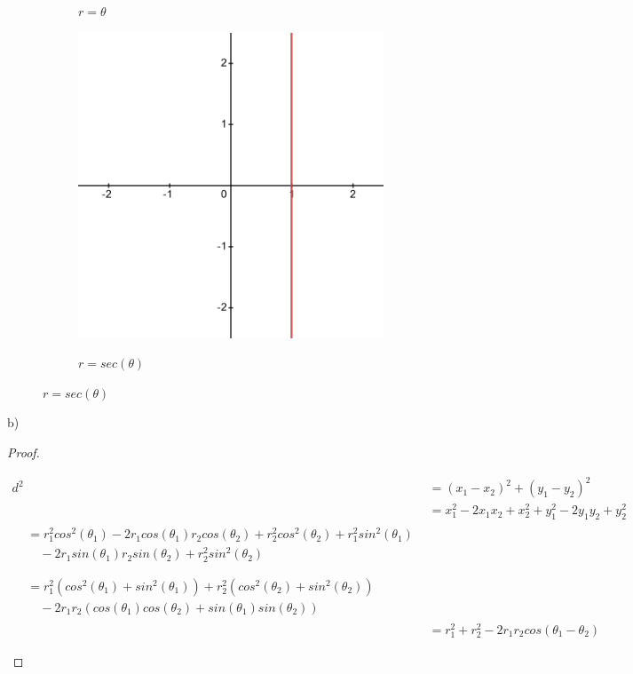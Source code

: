 \documentclass[11pt]{article}
\newcommand{\bproof}{\begin{proof}
$ $ \\
\begin{adjustwidth}{3em}{0pt}
}
\newcommand{\eproof}{\end{adjustwidth}
\end{proof}}
\begin{document}
\begin{flushleft}
\begin{figure}[h]
\begin{subfigure}[b]{0.3\textwidth}
	\label{fig:ii}
	\caption{$r=\theta$}
	\end{subfigure}
	\hfill
	\begin{subfigure}[b]{0.3\textwidth}
	\centering
	\includegraphics[width=\textwidth]{requalssecanttheta.png}
	\label{fig:iii}
	\caption{$r=sec(\theta)$}
	\end{subfigure}
	
\end{figure}

b) \bigskip

\bproof
	\begin{align*}
	d^2 &= (x_1-x_2)^2 + (y_1-y_2)^2 \\
	&= x_1^2 -2x_1x_2 + x_2^2 + y_1^2 -2y_1y_2 + y_2^2 \\	
	\begin{split}
	&= r_1^2cos^2(\theta_1) -2r_1cos(\theta_1)r_2cos(\theta_2) + r_2^2cos^2(\theta_2) + r_1^2sin^2(\theta_1) \\
	& \quad -2r_1sin(\theta_1)r_2sin(\theta_2) + r_2^2sin^2(\theta_2) \\
	\end{split} \\
	\begin{split}
	&= r_1^2(cos^2(\theta_1) + sin^2(\theta_1)) + r_2^2(cos^2(\theta_2) + sin^2(\theta_2)) \\
& \quad -2r_1r_2(cos(\theta_1)cos(\theta_2) + sin(\theta_1)sin(\theta_2))
	\end{split} \\
	&= r_1^2 + r_2^2 -2r_1r_2cos(\theta_1 - \theta_2)
	\end{align*}
\eproof


\end{flushleft}
\end{document}

